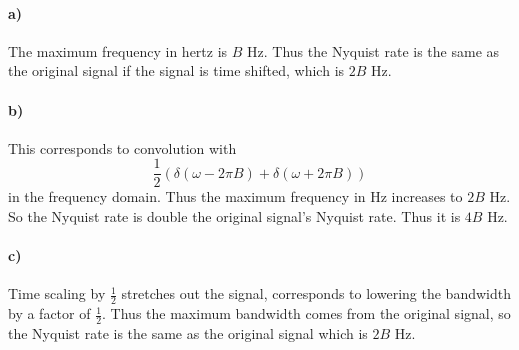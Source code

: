 \documentclass[12pt]{article}
\begin{document}
\paragraph{a)}

The maximum frequency in hertz is \(B\) Hz. Thus the Nyquist rate is the same as the original signal if the signal is time shifted, which is \(2B\) Hz.

\paragraph{b)}

This corresponds to convolution with
\[\frac{1}{2}(\delta(\omega-2\pi B)+\delta(\omega+2\pi B))\]
in the frequency domain. Thus the maximum frequency in Hz increases to \(2B\) Hz. So the Nyquist rate is double the original signal's Nyquist rate.
Thus it is \(4B\) Hz.

\paragraph{c)}

Time scaling by \(\frac{1}{2}\) stretches out the signal, corresponds to lowering the bandwidth by a factor of \(\frac{1}{2}\). Thus the maximum bandwidth comes from
the original signal, so the Nyquist rate is the same as the original signal which is \(2B\) Hz.
\end{document}

